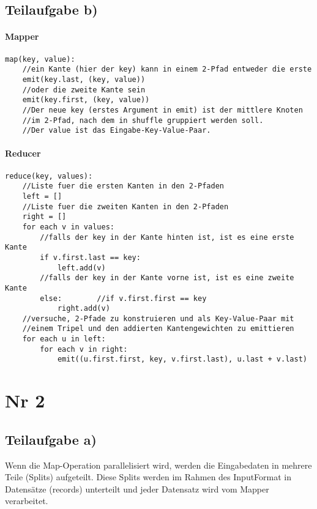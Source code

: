 \documentclass{article}
\begin{document}
\subsection{Teilaufgabe b)}

\paragraph{Mapper}
\begin{lstlisting}
map(key, value):
	//ein Kante (hier der key) kann in einem 2-Pfad entweder die erste
	emit(key.last, (key, value))
	//oder die zweite Kante sein
	emit(key.first, (key, value))
	//Der neue key (erstes Argument in emit) ist der mittlere Knoten
	//im 2-Pfad, nach dem in shuffle gruppiert werden soll.
	//Der value ist das Eingabe-Key-Value-Paar.
\end{lstlisting}

\newpage

\paragraph{Reducer}
\begin{lstlisting}
reduce(key, values):
	//Liste fuer die ersten Kanten in den 2-Pfaden
	left = []
	//Liste fuer die zweiten Kanten in den 2-Pfaden
	right = []
	for each v in values:
		//falls der key in der Kante hinten ist, ist es eine erste Kante
		if v.first.last == key:
			left.add(v)
		//falls der key in der Kante vorne ist, ist es eine zweite Kante
		else:        //if v.first.first == key
			right.add(v)
	//versuche, 2-Pfade zu konstruieren und als Key-Value-Paar mit
	//einem Tripel und den addierten Kantengewichten zu emittieren
	for each u in left:
		for each v in right:
			emit((u.first.first, key, v.first.last), u.last + v.last)
\end{lstlisting}


\section{Nr 2}

\subsection{Teilaufgabe a)}
Wenn die Map-Operation parallelisiert wird, werden die Eingabedaten in mehrere Teile (Splits) aufgeteilt.
Diese Splits werden im Rahmen des InputFormat in Datensätze (records) unterteilt und jeder Datensatz wird vom Mapper verarbeitet.
\end{document}
